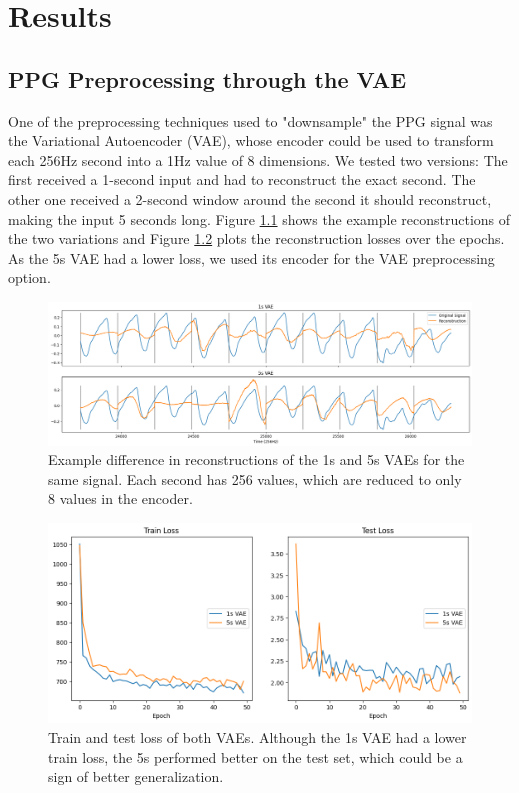 \chapter{Results \label{Chapter-Results}}

\section{PPG Preprocessing through the VAE}

One of the preprocessing techniques used to "downsample" the PPG signal was the Variational Autoencoder (VAE), whose encoder could be used to transform each 256Hz second into a 1Hz value of 8 dimensions. We tested two versions: The first received a 1-second input and had to reconstruct the exact second. The other one received a 2-second window around the second it should reconstruct, making the input 5 seconds long. Figure \ref{fig:vaereconstruction} shows the example reconstructions of the two variations and Figure \ref{fig:vaeloss} plots the reconstruction losses over the epochs. As the 5s VAE had a lower loss, we used its encoder for the VAE preprocessing option.

\begin{figure}[h]
    \centering
    \includegraphics[width=\textwidth]{images/VaeReconstruction}
    \caption{Example difference in reconstructions of the 1s and 5s VAEs for the same signal. Each second has 256 values, which are reduced to only 8 values in the encoder.}
    \label{fig:vaereconstruction}
\end{figure}

\begin{figure}
    \centering
    \includegraphics[width=\textwidth]{images/VaeLoss}
    \caption{Train and test loss of both VAEs. Although the 1s VAE had a lower train loss, the 5s performed better on the test set, which could be a sign of better generalization.}
    \label{fig:vaeloss}
\end{figure}

